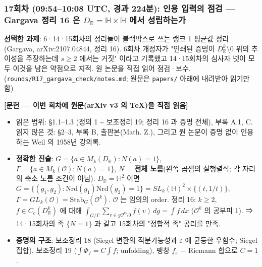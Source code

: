 \hypertarget{uxd68cuxcc28-09541008-utc-uxacbduxacfc-224uxbd84-uxc778uxc6a9-uxc785uxb825uxc758-uxc810uxac80-gargava-uxc815uxb9ac-16-uxc740-d_mathbb-rmathbb-htimesmathbb-h-uxc5d0uxc11c-uxc131uxb9bduxd558uxb294uxac00}{%
\subsubsection*{\texorpdfstring{17회차 (09:54--10:08 UTC, 경과 224분): 인용 입력의 점검 --- Gargava 정리 16 은 \(D_\mathbb R=\mathbb H\times\mathbb H\) 에서 성립하는가}{17회차 (09:54--10:08 UTC, 경과 224분): 인용 입력의 점검 --- Gargava 정리 16 은 D\_\textbackslash mathbb R=\textbackslash mathbb H\textbackslash times\textbackslash mathbb H 에서 성립하는가}}\label{uxd68cuxcc28-09541008-utc-uxacbduxacfc-224uxbd84-uxc778uxc6a9-uxc785uxb825uxc758-uxc810uxac80-gargava-uxc815uxb9ac-16-uxc740-d_mathbb-rmathbb-htimesmathbb-h-uxc5d0uxc11c-uxc131uxb9bduxd558uxb294uxac00}}

\textbf{선택한 과제}: 6·14·15회차의 정리들이 블랙박스로 쓰는 랭크 1 평균값 정리(Gargava, arXiv:2107.04844, 정리 16). 6회차 개정자가 "인쇄된 증명이 \(D_\mathbb R^k\setminus0\) 위의 추이성을 주장하는데 \(s\ge2\) 에서는 거짓" 이라고 기록했고 14·15회차의 심사자 넷이 모두 이것을 남은 약점으로 지적. 원 논문을 직접 읽어 점검·보수. (\texttt{rounds/R17\_gargava\_check/notes.md}; 원문은 \texttt{papers/} 아래에 내려받아 읽기만 함)

\textbf{{[}문헌 --- 이번 회차에 원문(arXiv v3 의 TeX)을 직접 읽음{]}}

\begin{itemize}
\tightlist
\item
  읽은 범위: §1.1--1.3 (정의 1 \textasciitilde{} 보조정리 19; 정리 16 과 증명 전체), 부록 A.1, C. 읽지 않은 것: §2--3, 부록 B, 출판본(Math. Z.), 그리고 원 논문이 증명 없이 인용하는 Weil 의 1958년 강의록.
\item
  \textbf{정확한 진술}: \(G=\{a\in M_k(D_\mathbb R):N(a)=1\}\), \(\Gamma=\{a\in M_k(\mathcal O):N(a)=1\}\), \(N\) = \textbf{전체 노름}(왼쪽 곱셈의 실행렬식; 각 자리의 축소 노름 조건이 아님). \(D_\mathbb R=\mathbb H^2\) 이면 \(G=\{(g_1,g_2):\mathrm{Nrd}(g_1)\mathrm{Nrd}(g_2)=1\}=SL_k(\mathbb H)^2\times\{(t,1/t)\}\), \(\Gamma=GL_k(\mathcal O)=\mathrm{Stab}_G(\mathcal O^k)\). \(\mathcal O\) 는 임의의 order. 정리 16: \(k\ge2\), \(f\in C_c(D_\mathbb R^k)\) 에 대해 \(\int_{G/\Gamma}\sum_{v\in g\mathcal O^k\setminus0}f(v)\,dg=\int f\,dx\) (\(\mathcal O^k\) 의 공부피 1). ⇒ 14·15회차의 족 \(\{N=1\}\) 과 같고 15회차의 "정합적 족" 공리를 만족.
\item
  \textbf{증명의 구조}: 보조정리 18 (Siegel 변환의 적분가능성과 \(\varepsilon\) 에 균등한 우함수; Siegel 집합), 보조정리 19 (\(\int\Phi_f=C\int f\); unfolding), 팽창 \(f_\varepsilon\) + Riemann 합으로 \(C=1\).
\end{itemize}

